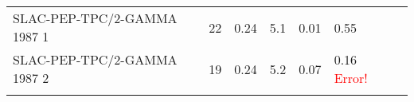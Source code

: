\begin{landscape}
\begin{center}
\begin{tabular}{*8l}
	 SLAC-PEP-TPC/2-GAMMA 1987 1&  \cite{Aihara:1986xw}& \hspace{1.0cm} 22&0.24& 5.1 & 0.01&0.55\\
	 SLAC-PEP-TPC/2-GAMMA 1987 2&  \cite{Aihara:1986xq}& \hspace{1.0cm} 19&0.24& 5.2 & 0.07&0.16 \textcolor{red}{Error!}\\
	 
	 \\\bottomrule
		\hline
	\end{tabular}
\end{center}

\end{landscape}


